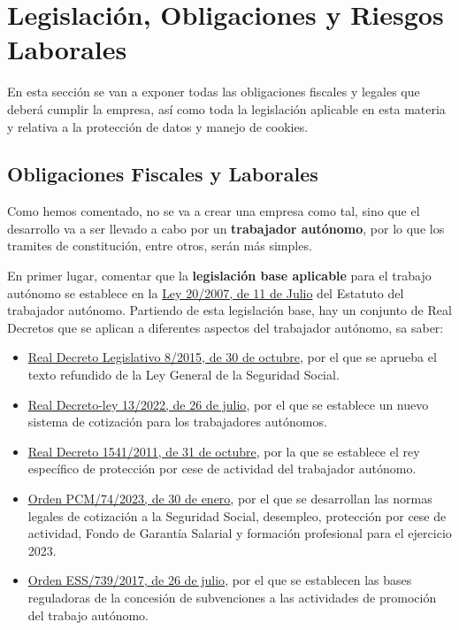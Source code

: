 \section{Legislación, Obligaciones y  Riesgos Laborales}
En esta sección se van a exponer todas las obligaciones fiscales y legales que deberá cumplir la empresa, así como toda la legislación aplicable en esta materia y relativa a la protección de datos y manejo de cookies.

\subsection{Obligaciones Fiscales y Laborales}
Como hemos comentado, no se va a crear una empresa como tal, sino que el desarrollo va a ser llevado a cabo por un \textbf{trabajador autónomo}, por lo que los tramites de constitución, entre otros, serán más simples.

En primer lugar, comentar que la \textbf{legislación base aplicable} para el trabajo autónomo se establece en la \href{https://www.boe.es/buscar/act.php?id=BOE-A-2007-13409}{Ley 20/2007, de 11 de Julio} del Estatuto del trabajador autónomo. Partiendo de esta legislación base, hay un conjunto de Real Decretos que se aplican a diferentes aspectos del trabajador autónomo, sa saber:

\begin{itemize}
	\item \href{https://www.boe.es/buscar/act.php?id=BOE-A-2015-11724}{Real Decreto Legislativo 8/2015, de 30 de octubre}, por el que se aprueba el texto refundido de la Ley General de la Seguridad Social.
	\item \href{https://www.boe.es/buscar/doc.php?id=BOE-A-2022-12482}{Real Decreto-ley 13/2022, de 26 de julio}, por el que se establece un nuevo sistema de cotización para los trabajadores autónomos.
	\item \href{https://www.boe.es/buscar/doc.php?id=BOE-A-2011-17173}{Real Decreto 1541/2011, de 31 de octubre}, por la que se establece el rey específico de protección por cese de actividad del trabajador autónomo.
	\item \href{https://www.boe.es/diario_boe/txt.php?id=BOE-A-2023-2472}{Orden PCM/74/2023, de 30 de enero}, por el que se desarrollan las normas legales de cotización a la Seguridad Social, desempleo, protección por cese de actividad, Fondo de Garantía Salarial y formación profesional para el ejercicio 2023.
	\item \href{https://www.boe.es/buscar/doc.php?id=BOE-A-2017-9211}{Orden ESS/739/2017, de 26 de julio}, por el que se establecen las bases reguladoras de la concesión de subvenciones a las actividades de promoción del trabajo autónomo.
\end{itemize}

